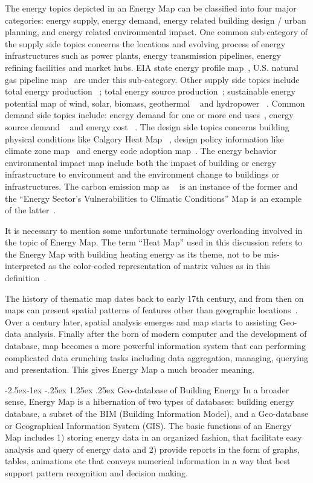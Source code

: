 \documentclass[hidelinks,12pt]{article}
\makeatletter
\renewcommand\paragraph{\@startsection{paragraph}{4}{\z@}%
            {-2.5ex\@plus -1ex \@minus -.25ex}%
            {1.25ex \@plus .25ex}%
            {\normalfont\normalsize\bfseries}}
\makeatother
\begin{document}
The energy topics depicted in an Energy Map can be classified into
four major categories: energy supply, energy demand, energy related
building design / urban planning, and energy related environmental
impact. One common sub-category of the supply side topics concerns the
locations and evolving process of energy infrastructures such as power
plants, energy transmission pipelines, energy refining facilities and
market hubs. EIA state energy profile map~\cite{EIAProfile2015},
U.S. natural gas pipeline map~\cite{EIAGaspipe} are under this
sub-category. Other supply side topics include total energy production
~\cite{DOEEnergyProduct}; total energy source
production~\cite{EIACoalProduct}; sustainable energy potential map of
wind, solar, biomass, geothermal ~\cite{NRELMap2015} and hydropower
~\cite{DOEHydro}. Common demand side topics include: energy
demand for one or more end uses~\cite{heatMap2012}, energy source
demand ~\cite{EIACoalDemand} and energy cost
~\cite{DOEEnergyCost}. The design side topics concerns building
physical conditions like Calgory Heat Map ~\cite{Hay2011}, design
policy information like climate zone map~\cite{IECCClimate} and energy
code adoption map~\cite{CodeAdopt}. The energy behavior environmental
impact map include both the impact of building or energy
infrastructure to environment and the environment change to buildings
or infrastructures. The carbon emission map as ~\cite{CO2Atlas} is an
instance of the former and the ``Energy Sector's Vulnerabilities to
Climatic Conditions'' Map is an example of the
latter~\cite{DOEVulner}.

It is necessary to mention some unfortunate terminology overloading
involved in the topic of Energy Map. The term ``Heat Map'' used in
this discussion refers to the Energy Map with building heating energy
as its theme, not to be mis-interpreted as the color-coded
representation of matrix values as in this
definition~\cite{HeatmapWiki}.

The history of thematic map dates back to early 17th century, and from
then on maps can present spatial patterns of features other than
geographic locations~\cite{ThematicMap}. Over a century later, spatial
analysis emerges and map starts to assisting Geo-data
analysis. Finally after the born of modern computer and the
development of database, map becomes a more powerful information
system that can performing complicated data crunching tasks including
data aggregation, managing, querying and presentation. This gives
Energy Map a much broader meaning.

\paragraph{Geo-database of Building Energy}
In a broader sense, Energy Map is a hibernation of two types of
databases: building energy database, a subset of the BIM (Building
Information Model), and a Geo-database or Geographical Information
System (GIS). The basic functions of an Energy Map includes 1) storing
energy data in an organized fashion, that facilitate easy analysis and
query of energy data and 2) provide reports in the form of graphs,
tables, animations etc that conveys numerical information in a way
that best support pattern recognition and decision making.
\end{document}
